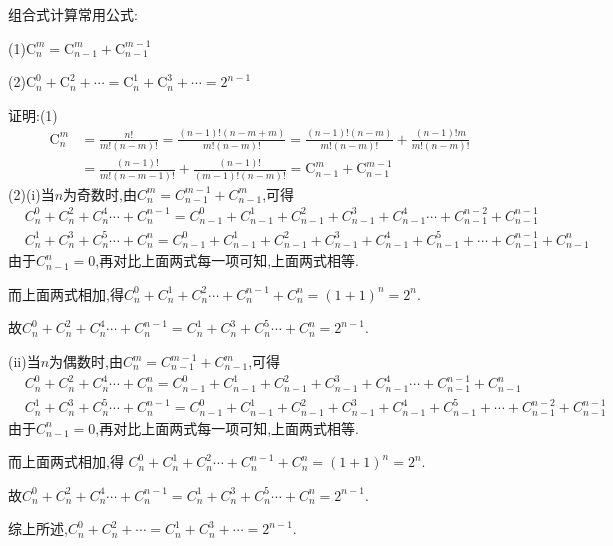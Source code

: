 \documentclass[../../main.tex]{subfiles}%
\begin{document}
\begin{conclusion}
\hypertarget{组合式计算常用公式}{组合式计算常用公式:}

(1)$\mathrm{C}_{n}^{m}=\mathrm{C}_{n-1}^{m}+\mathrm{C}_{n-1}^{m-1}$

(2)$\mathrm{C}_{n}^{0}+\mathrm{C}_{n}^{2}+\cdots =\mathrm{C}_{n}^{1}+\mathrm{C}_{n}^{3}+\cdots =2^{n-1}$

证明:(1)\begin{align*}
\mathrm{C}_{n}^{m}&=\frac{n!}{m!\left( n-m \right) !}=\frac{\left( n-1 \right) !\left( n-m+m \right)}{m!\left( n-m \right) !}=\frac{\left( n-1 \right) !\left( n-m \right)}{m!\left( n-m \right) !}+\frac{\left( n-1 \right) !m}{m!\left( n-m \right) !}
\\
&=\frac{\left( n-1 \right) !}{m!\left( n-m-1 \right) !}+\frac{\left( n-1 \right) !}{\left( m-1 \right) !\left( n-m \right) !}=\mathrm{C}_{n-1}^{m}+\mathrm{C}_{n-1}^{m-1}
\end{align*}
(2)(i)当\(n\)为奇数时,由\(C_{n}^{m}=C_{n - 1}^{m - 1} + C_{n - 1}^{m}\),可得
\begin{align*}
&C_{n}^{0} + C_{n}^{2} + C_{n}^{4} \cdots + C_{n}^{n - 1} = C_{n - 1}^{0} + C_{n - 1}^{1} + C_{n - 1}^{2} + C_{n - 1}^{3} + C_{n - 1}^{4} \cdots + C_{n - 1}^{n - 2} + C_{n - 1}^{n - 1}
\\
&C_{n}^{1} + C_{n}^{3} + C_{n}^{5} \cdots + C_{n}^{n} = C_{n - 1}^{0} + C_{n - 1}^{1} + C_{n - 1}^{2} + C_{n - 1}^{3} + C_{n - 1}^{4} + C_{n - 1}^{5} + \cdots + C_{n - 1}^{n - 1} + C_{n - 1}^{n}
\end{align*}
由于\(C_{n - 1}^{n} = 0\),再对比上面两式每一项可知,上面两式相等.

而上面两式相加,得$
C_{n}^{0} + C_{n}^{1} + C_{n}^{2} \cdots + C_{n}^{n - 1} + C_{n}^{n} = (1 + 1)^n = 2^n.$

故\(C_{n}^{0} + C_{n}^{2} + C_{n}^{4} \cdots + C_{n}^{n - 1} = C_{n}^{1} + C_{n}^{3} + C_{n}^{5} \cdots + C_{n}^{n} = 2^{n - 1}\).

(ii)当\(n\)为偶数时,由\(C_{n}^{m} = C_{n - 1}^{m - 1} + C_{n - 1}^{m}\),可得
\begin{align*}
&C_{n}^{0} + C_{n}^{2} + C_{n}^{4} \cdots + C_{n}^{n} = C_{n - 1}^{0} + C_{n - 1}^{1} + C_{n - 1}^{2} + C_{n - 1}^{3} + C_{n - 1}^{4} \cdots + C_{n - 1}^{n - 1} + C_{n - 1}^{n} 
\\
&C_{n}^{1} + C_{n}^{3} + C_{n}^{5} \cdots + C_{n}^{n - 1} = C_{n - 1}^{0} + C_{n - 1}^{1} + C_{n - 1}^{2} + C_{n - 1}^{3} + C_{n - 1}^{4} + C_{n - 1}^{5} + \cdots + C_{n - 1}^{n - 2} + C_{n - 1}^{n - 1}
\end{align*}
由于\(C_{n - 1}^{n} = 0\),再对比上面两式每一项可知,上面两式相等.

而上面两式相加,得
$C_{n}^{0} + C_{n}^{1} + C_{n}^{2} \cdots + C_{n}^{n - 1} + C_{n}^{n} = (1 + 1)^n = 2^n.$

故\(C_{n}^{0} + C_{n}^{2} + C_{n}^{4} \cdots + C_{n}^{n - 1} = C_{n}^{1} + C_{n}^{3} + C_{n}^{5} \cdots + C_{n}^{n} = 2^{n - 1}\).

综上所述,\(C_{n}^{0} + C_{n}^{2} + \cdots = C_{n}^{1} + C_{n}^{3} + \cdots = 2^{n - 1}\). 
\end{conclusion}
\end{document}
